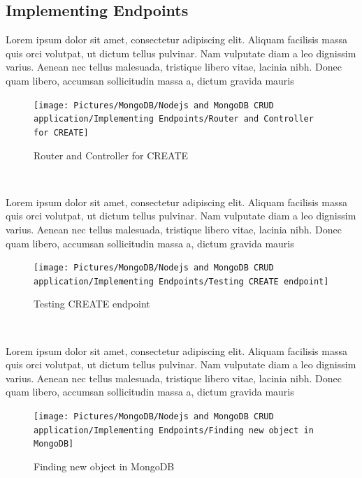 \begin{spacing}{1.2}
\section{Implementing Endpoints }
\par Lorem ipsum dolor sit amet, consectetur adipiscing elit. Aliquam facilisis massa quis orci volutpat, ut dictum tellus pulvinar. Nam vulputate diam a leo dignissim varius. Aenean nec tellus malesuada, tristique libero vitae, lacinia nibh. Donec quam libero, accumsan sollicitudin massa a, dictum gravida mauris
\\
\begin{figure}[!htb] 
\begin{center} 
\texttt{[image: Pictures/MongoDB/Nodejs and MongoDB CRUD  application/Implementing Endpoints/Router and Controller for CREATE]} 
\end{center} 
\caption{Router and Controller for CREATE} 
\end{figure}  \FloatBarrier
\\

\par Lorem ipsum dolor sit amet, consectetur adipiscing elit. Aliquam facilisis massa quis orci volutpat, ut dictum tellus pulvinar. Nam vulputate diam a leo dignissim varius. Aenean nec tellus malesuada, tristique libero vitae, lacinia nibh. Donec quam libero, accumsan sollicitudin massa a, dictum gravida mauris
\\
\begin{figure}[!htb] 
\begin{center} 
\texttt{[image: Pictures/MongoDB/Nodejs and MongoDB CRUD  application/Implementing Endpoints/Testing CREATE endpoint]} 
\end{center} 
\caption{Testing CREATE endpoint} 
\end{figure}  \FloatBarrier
\\

\par Lorem ipsum dolor sit amet, consectetur adipiscing elit. Aliquam facilisis massa quis orci volutpat, ut dictum tellus pulvinar. Nam vulputate diam a leo dignissim varius. Aenean nec tellus malesuada, tristique libero vitae, lacinia nibh. Donec quam libero, accumsan sollicitudin massa a, dictum gravida mauris
\\
\begin{figure}[!htb] 
\begin{center} 
\texttt{[image: Pictures/MongoDB/Nodejs and MongoDB CRUD  application/Implementing Endpoints/Finding new object in MongoDB]} 
\end{center} 
\caption{Finding new object in MongoDB} 
\end{figure}  \FloatBarrier
\\


\end{spacing}
